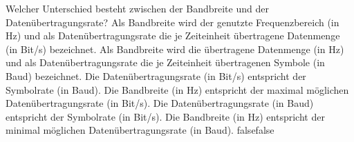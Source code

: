     {Welcher Unterschied besteht zwischen der Bandbreite und der Datenübertragungsrate?}
    {Als Bandbreite wird der genutzte Frequenzbereich (in Hz) und als Datenübertragungsrate die je Zeiteinheit übertragene Datenmenge (in Bit/s) bezeichnet.}
    {Als Bandbreite wird die übertragene Datenmenge (in Hz) und als Datenübertragungsrate die je Zeiteinheit übertragenen Symbole (in Baud) bezeichnet. }
    {Die Datenübertragungsrate (in Bit/s) entspricht der Symbolrate (in Baud). Die Bandbreite (in Hz) entspricht der maximal möglichen Datenübertragungsrate (in Bit/s).}
    {Die Datenübertragungsrate (in Baud) entspricht der Symbolrate (in Bit/s). Die Bandbreite (in Hz) entspricht der minimal möglichen Datenübertragungsrate (in Baud).}
    {false}{false}